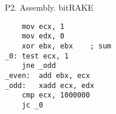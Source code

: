 \documentclass[12pt, a4page, oneside]{article}
\begin{document}
\begin{CJK*}{UTF8}{gbsn}
\begin{listing}[ht]
\caption{P2. Assembly. bitRAKE}
\begin{verbatim}
	mov ecx, 1
	mov edx, 0
	xor ebx, ebx	; sum
_0:	test ecx, 1
	jne _odd
_even:	add ebx, ecx
_odd:	xadd ecx, edx
	cmp ecx, 1000000
	jc _0
\end{verbatim}
\end{listing}

\newpage
\renewcommand\listoflistingscaption{List of source codes}
\listoflistings



\end{CJK*}
\end{document}
